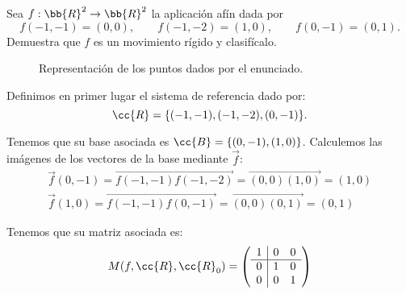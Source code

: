 \begin{ejercicio}
    Sea $f : \bb{R}^2\to \bb{R}^2$ la aplicación afín dada por
    \begin{equation*}
        f(-1, -1) = (0, 0),\qquad  f(-1, -2) = (1, 0),\qquad f(0, -1) = (0, 1).
    \end{equation*}
    Demuestra que $f$ es un movimiento rígido y clasifícalo.

    \begin{figure}[H]
        \centering
        \caption{Representación de los puntos dados por el enunciado.}
    \end{figure}

    Definimos en primer lugar el sistema de referencia dado por: $$\cc{R}=\{(-1,-1), (-1,-2), (0,-1)\}.$$
    
    Tenemos que su base asociada es $\cc{B} = \{(0, -1), (1, 0)\}$. Calculemos las imágenes de los vectores de la base mediante $\vec{f}$:
    \begin{gather*}
        \vec{f}(0, -1) = \vec{f(-1, -1)f(-1,-2)} = \vec{(0,0)(1,0)} = (1,0) \\
        \vec{f}(1,0) = \vec{f(-1, -1)f(0, -1)} = \vec{(0,0)(0,1)} = (0,1)
    \end{gather*}

    Tenemos que su matriz asociada es:
    \begin{equation*}
        M(f, \cc{R}, \cc{R}_0) = \left(\begin{array}{c|cc}
            1 & 0 & 0 \\ \hline
            0 & 1 & 0 \\
            0 & 0 & 1
        \end{array}\right)
    \end{equation*}


\end{ejercicio}
